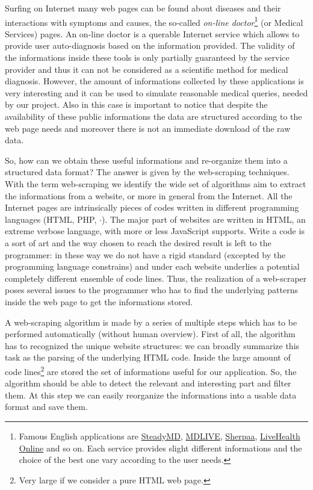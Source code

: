 \documentclass{standalone}
\begin{document}
Surfing on Internet many web pages can be found about diseases and their interactions with symptoms and causes, the so-called \emph{on-line doctor}\footnote{
  Famous English applications are \href{https://www.steadymd.com/?utm_source=bestonlinedoctors&utm_medium=partner&utm_campaign=bizdev}{SteadyMD}, \href{https://www.mdlive.com/}{MDLIVE}, \href{https://sherpaa.com/}{Sherpaa}, \href{https://livehealthonline.com/}{LiveHealth Online} and so on.
  Each service provides slight different informations and the choice of the best one vary according to the user needs.
} (or Medical Services) pages.
An on-line doctor is a querable Internet service which allows to provide user auto-diagnosis based on the information provided.
The validity of the informations inside these tools is only partially guaranteed by the service provider and thus it can not be considered as a scientific method for medical diagnosis.
However, the amount of informations collected by these applications is very interesting and it can be used to simulate reasonable medical queries, needed by our project.
Also in this case is important to notice that despite the availability of these public informations the data are structured according to the web page needs and moreover there is not an immediate download of the raw data.

So, how can we obtain these useful informations and re-organize them into a structured data format?
The answer is given by the \textsf{web-scraping} techniques.
With the term \textsf{web-scraping} we identify the wide set of algorithms aim to extract the informations from a website, or more in general from the Internet.
All the Internet pages are intrinsically pieces of codes written in different programming languages (HTML, PHP, $\cdot$).
The major part of websites are written in HTML, an extreme verbose language, with more or less JavaScript supports.
Write a code is a sort of art and the way chosen to reach the desired result is left to the programmer: in these way we do not have a rigid standard (excepted by the programming language constrains) and under each website underlies a potential completely different ensemble of code lines.
Thus, the realization of a web-scraper poses several issues to the programmer who has to find the underlying patterns inside the web page to get the informations stored.

A web-scraping algorithm is made by a series of multiple steps which has to be performed automatically (without human overview).
First of all, the algorithm has to recognized the unique website structures: we can broadly summarize this task as the parsing of the underlying HTML code.
Inside the large amount of code lines\footnote{
  Very large if we consider a pure HTML web page.
} are stored the set of informations useful for our application.
So, the algorithm should be able to detect the relevant and interesting part and filter them.
At this step we can easily reorganize the informations into a usable data format and save them.
\end{document}
